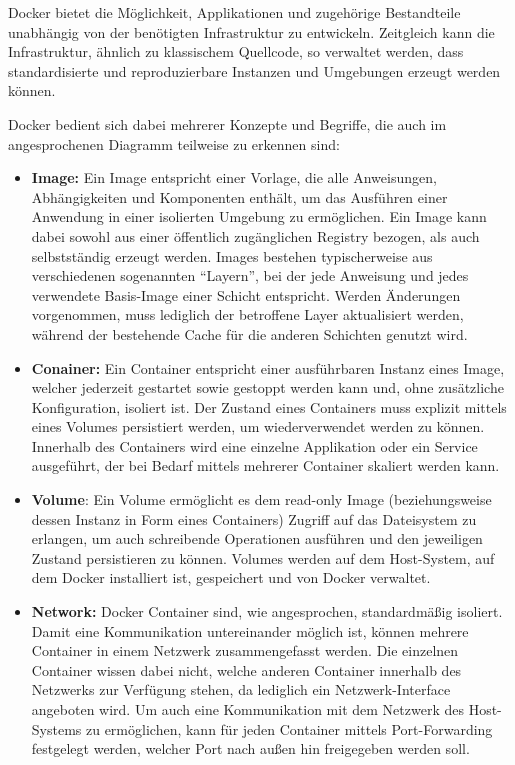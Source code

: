\documentclass[a4paper,12pt,twoside]{scrreprt}
\begin{document}
Docker bietet die Möglichkeit, Applikationen und zugehörige Bestandteile unabhängig von der benötigten Infrastruktur zu entwickeln. Zeitgleich kann die Infrastruktur, ähnlich zu klassischem Quellcode, so verwaltet werden, dass standardisierte und reproduzierbare Instanzen und Umgebungen erzeugt werden können. \cite{docker_inc_docker_2023}

Docker bedient sich dabei mehrerer Konzepte und Begriffe, die auch im angesprochenen Diagramm teilweise zu erkennen sind:
\begin{itemize}
    \item \textbf{Image:} Ein Image entspricht einer Vorlage, die alle Anweisungen, Abhängigkeiten und Komponenten enthält, um das Ausführen einer Anwendung in einer isolierten Umgebung zu ermöglichen. Ein Image kann dabei sowohl aus einer öffentlich zugänglichen Registry bezogen, als auch selbstständig erzeugt werden. Images bestehen typischerweise aus verschiedenen sogenannten \enquote{Layern}, bei der jede Anweisung und jedes verwendete Basis-Image einer Schicht entspricht. Werden Änderungen vorgenommen, muss lediglich der betroffene Layer aktualisiert werden, während der bestehende Cache für die anderen Schichten genutzt wird. \cite{docker_inc_docker_2023, montemagno_docker_2023}
    \item \textbf{Conainer:} Ein Container entspricht einer ausführbaren Instanz eines Image, welcher jederzeit gestartet sowie gestoppt werden kann und, ohne zusätzliche Konfiguration, isoliert ist. Der Zustand eines Containers muss explizit mittels eines Volumes persistiert werden, um wiederverwendet werden zu können. Innerhalb des Containers wird eine einzelne Applikation oder ein Service ausgeführt, der bei Bedarf mittels mehrerer Container skaliert werden kann. \cite{docker_inc_docker_2023, montemagno_docker_2023}
    \item \textbf{Volume}: Ein Volume ermöglicht es dem read-only Image (beziehungsweise dessen Instanz in Form eines Containers)  Zugriff auf das Dateisystem zu erlangen, um auch schreibende Operationen ausführen und den jeweiligen Zustand persistieren zu können. Volumes werden auf dem Host-System, auf dem Docker installiert ist, gespeichert und von Docker verwaltet. \cite{montemagno_docker_2023}
    \item \textbf{Network:} Docker Container sind, wie angesprochen, standardmäßig isoliert. Damit eine Kommunikation untereinander möglich ist, können mehrere Container in einem Netzwerk zusammengefasst werden. Die einzelnen Container wissen dabei nicht, welche anderen Container innerhalb des Netzwerks zur Verfügung stehen, da lediglich ein Netzwerk-Interface angeboten wird. Um auch eine Kommunikation mit dem Netzwerk des Host-Systems zu ermöglichen, kann für jeden Container mittels Port-Forwarding festgelegt werden, welcher Port nach außen hin freigegeben werden soll. \cite{docker_inc_networking_overview_2023}
\end{itemize}
\end{document}
